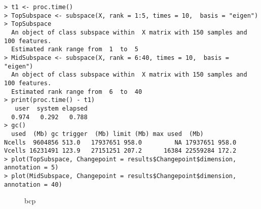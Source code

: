 \documentclass[12pt]{article}
\newcommand{\sidepic}[8]{
\begin{figure}[H]%
    \centering
    \subfloat[#1]{{\texttt{[image: \#3]} }}%
    \qquad
    \subfloat[#4]{{\texttt{[image: \#6]} }}%
    \caption{#7}%
    \label{#8}%
\end{figure}
}
\begin{document}
\begin{lstlisting}
> t1 <- proc.time()
> TopSubspace <- subspace(X, rank = 1:5, times = 10,  basis = "eigen")
> TopSubspace
  An object of class subspace within  X matrix with 150 samples and 100 features.
  Estimated rank range from  1  to  5
> MidSubspace <- subspace(X, rank = 6:40, times = 10,  basis = "eigen")
  An object of class subspace within  X matrix with 150 samples and 100 features.
  Estimated rank range from  6  to  40
> print(proc.time() - t1)
   user  system elapsed
  0.974   0.292   0.788
> gc()
  used  (Mb) gc trigger  (Mb) limit (Mb) max used  (Mb)
Ncells  9604856 513.0   17937651 958.0         NA 17937651 958.0
Vcells 16231491 123.9   27151251 207.2      16384 22559284 172.2
> plot(TopSubspace, Changepoint = results$Changepoint$dimension, annotation = 5)
> plot(MidSubspace, Changepoint = results$Changepoint$dimension, annotation = 40)
\end{lstlisting}
\sidepic{label 1}{7}{{"Subspace_1_5_Scree"}.pdf}{label 2}{7}{{"Subspace_6_40_Scree"}.pdf}{bcp}{Figure 3}
\end{document}
